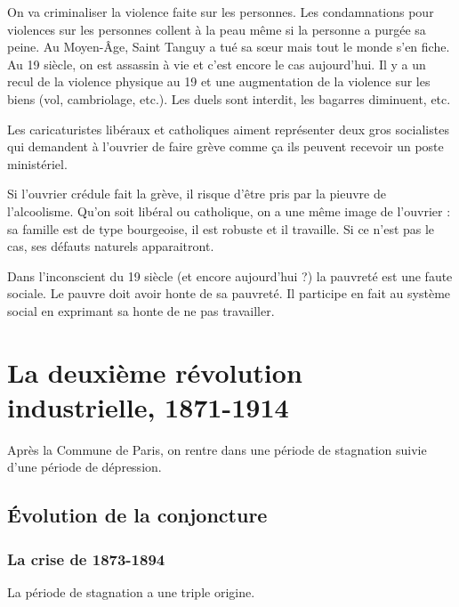\documentclass[12pt]{report}
\begin{document}
On va criminaliser la violence faite sur les personnes. Les condamnations pour violences sur
les personnes collent à la peau même si la personne a purgée sa peine. Au Moyen-Âge, Saint
Tanguy a tué sa sœur mais tout le monde s’en fiche. Au 19 siècle, on est assassin à vie et
c’est encore le cas aujourd’hui. Il y a un recul de la violence physique au 19 et une
augmentation de la violence sur les biens (vol, cambriolage, etc.). Les duels sont interdit,
les bagarres diminuent, etc.

Les caricaturistes libéraux et catholiques aiment représenter deux gros socialistes qui
demandent à l’ouvrier de faire grève comme ça ils peuvent recevoir un poste ministériel.

Si l’ouvrier crédule fait la grève, il risque d’être pris par la pieuvre de l’alcoolisme. Qu’on soit
libéral ou catholique, on a une même image de l’ouvrier : sa famille est de type bourgeoise, il
est robuste et il travaille. Si ce n’est pas le cas, ses défauts naturels apparaitront.

Dans l’inconscient du 19 siècle (et encore aujourd’hui ?) la pauvreté est une faute sociale.
Le pauvre doit avoir honte de sa pauvreté. Il participe en fait au système social en exprimant
sa honte de ne pas travailler.

\section{La deuxième révolution industrielle, 1871-1914}

Après la Commune de Paris, on rentre dans une période de stagnation suivie d’une période de
dépression.

\subsection{Évolution de la conjoncture}

\subsubsection{La crise de 1873-1894}

La période de stagnation a une triple origine.
\end{document}
